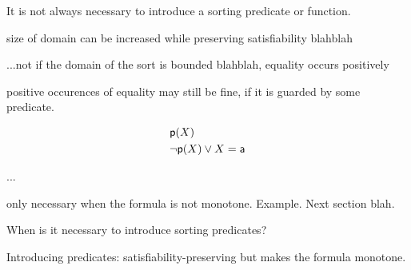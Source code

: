 It is not always necessary to introduce a sorting predicate or function.

size of domain can be increased while preserving satisfiability blahblah

...not if the domain of the sort is bounded blahblah, equality occurs positively

positive occurences of equality may still be fine, if it is guarded by some predicate.


\begin{example}
\label{ex:extension_conflict}
\begin{eqnarray}
 & \mbox{\sf p}(X) \\
 & \neg \mbox{\sf p}(X) \lor X = \mbox{\sf a} 
\end{eqnarray}
\end{example}



...

only necessary when the formula is not monotone. Example.
Next section blah.

When is it necessary to introduce sorting predicates?

Introducing predicates: satisfiability-preserving but makes the
formula monotone.
